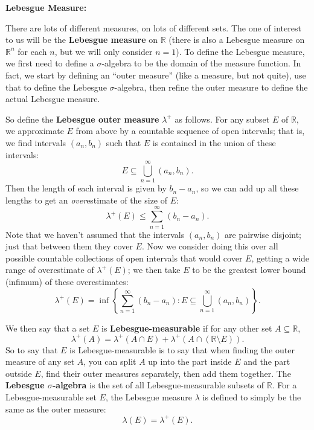 \documentclass{article}
\let\take\setminus
\let\lamdba\lambda
\begin{document}
\clearpage






\textbf{Lebesgue Measure:}\bigskip



There are lots of different measures, on lots of different sets. The one of interest to us will be the \textbf{Lebesgue measure} on $\mathbb{R}$ (there is also a Lebesgue measure on $\mathbb{R}^n$ for each $n$, but we will only consider $n=1$). To define the Lebesgue measure, we first need to define a $\sigma$-algebra to be the domain of the measure function. In fact, we start by defining an ``outer measure'' (like a measure, but not quite), use that to define the Lebesgue $\sigma$-algebra, then refine the outer measure to define the actual Lebesgue measure.

So define the \textbf{Lebesgue outer measure} $\lamdba^+$ as follows. For any subset $E$ of $\mathbb{R}$, we approximate $E$ from above by a countable sequence of open intervals; that is, we find intervals $(a_n,b_n)$ such that $E$ is contained in the union of these intervals:
\[E\subseteq \bigcup_{n=1}^\infty (a_n,b_n).\]
Then the length of each interval is given by $b_n-a_n$, so we can add up all these lengths to get an \textit{over}estimate of the size of $E$:
\[\lambda^+(E)\leq \sum_{n=1}^\infty \left(b_n-a_n\right).\]
Note that we haven't assumed that the intervals $(a_n,b_n)$ are pairwise disjoint; just that between them they cover $E$. Now we consider doing this over all possible countable collections of open intervals that would cover $E$, getting a wide range of overestimate of $\lambda^+(E)$; we then take $E$ to be the greatest lower bound (infimum) of these overestimates:
\[\lambda^+(E)=\inf\left\{\sum_{n=1}^\infty \left(b_n-a_n\right) : E\subseteq \bigcup_{n=1}^\infty (a_n,b_n)\right\}.\]




We then say that a set $E$ is \textbf{Lebesgue-measurable} if for any other set $A\subseteq \mathbb{R}$,
\[\lambda^+(A)=\lambda^+\left(A\cap E\right) + \lambda^+\left(A\cap (\mathbb{R}\take E)\right).\]
So to say that $E$ is Lebesgue-measurable is to say that when finding the outer measure of any set $A$, you can split $A$ up into the part inside $E$ and the part outside $E$, find their outer measures separately, then add them together. The \textbf{Lebesgue $\sigma$-algebra} is the set of all Lebesgue-measurable subsets of $\mathbb{R}$. For a Lebesgue-measurable set $E$, the Lebesgue measure $\lambda$ is defined to simply be the same as the outer measure:
\[\lambda(E)=\lambda^+(E).\]
\end{document}
